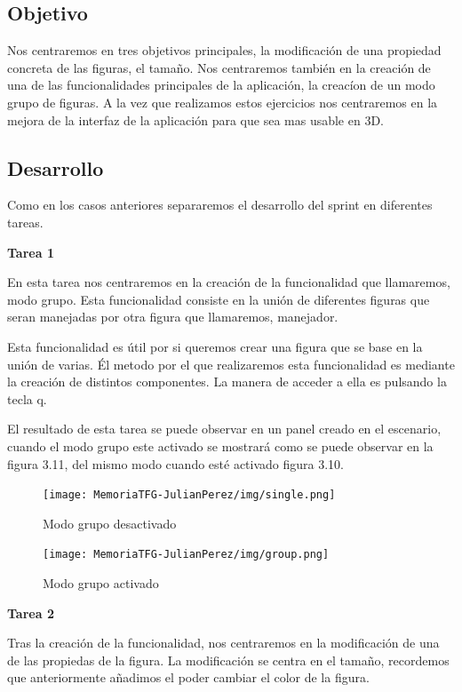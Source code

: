 \documentclass[a4paper, 12pt]{book}
\begin{document}
\subsection{Objetivo}
Nos centraremos en tres objetivos principales, la modificación de una propiedad concreta de las figuras, el tamaño. Nos centraremos también en la creación de una de las funcionalidades principales de la aplicación, la creacíon de un modo grupo de figuras. A la vez que realizamos estos ejercicios nos centraremos en la mejora de la interfaz de la aplicación para que sea mas usable en 3D.

\subsection{Desarrollo}
Como en los casos anteriores separaremos el desarrollo del sprint en diferentes tareas.

\textbf{Tarea 1}

En esta tarea nos centraremos en la creación de la funcionalidad que llamaremos, modo grupo. Esta funcionalidad consiste en la unión de diferentes figuras que seran manejadas por otra figura que llamaremos, manejador. 

Esta funcionalidad es útil por si queremos crear una figura que se base en la unión de varias. Él metodo por el que realizaremos esta funcionalidad es mediante la creación de distintos componentes. La manera de acceder a ella es pulsando la tecla q. 

El resultado de esta tarea se puede observar en un panel creado en el escenario, cuando el modo grupo este activado se mostrará como se puede observar en la figura 3.11, del mismo modo cuando esté activado figura 3.10.

\begin{figure}[H]
  \centering
  \begin{minipage}[b]{0.4\textwidth}
 \texttt{[image: MemoriaTFG-JulianPerez/img/single.png]}
  \caption{Modo grupo desactivado}\label{single}
  \end{minipage}
  \hfill
  \begin{minipage}[b]{0.4\textwidth}
  \texttt{[image: MemoriaTFG-JulianPerez/img/group.png]}
  \caption{Modo grupo activado}\label{scrum}
  \end{minipage}
\end{figure}

\textbf{Tarea 2}

Tras la creación de la funcionalidad, nos centraremos en la modificación de una de las propiedas de la figura. La modificación se centra en el tamaño, recordemos que anteriormente añadimos el poder cambiar el color de la figura.
\end{document}

